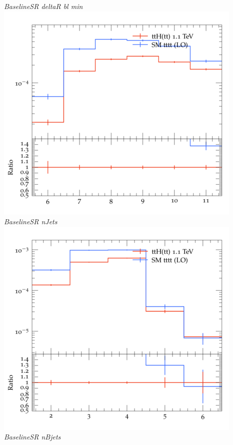 \documentclass{beamer}
\begin{document}
\begin{frame}
\begin{columns}
\textit{\small BaselineSR deltaR bl min}
\includegraphics[width=\textwidth]{../plots/ttH_1100/tttt_ttH_1LOS/BaselineSR_nJets.png}\\
\textit{\small BaselineSR nJets}
\includegraphics[width=\textwidth]{../plots/ttH_1100/tttt_ttH_1LOS/BaselineSR_nBjets.png}\\
\textit{\small BaselineSR nBjets}
\end{columns}
\end{frame}
\end{document}
